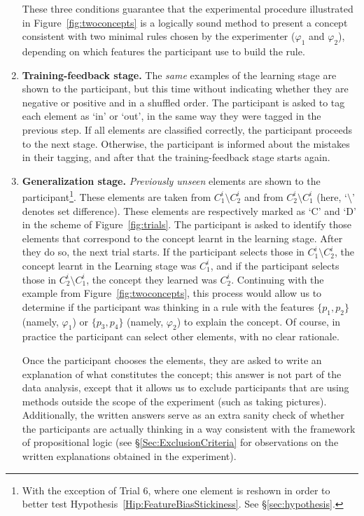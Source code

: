 \begin{enumerate}
  These three conditions guarantee that the experimental procedure illustrated in Figure~\ref{fig:twoconcepts} is a logically sound method to present a concept consistent with two minimal rules chosen by the experimenter ($\varphi_1$ and $\varphi_2$), depending on which features the participant use to build the rule.
    

    \item {\bf Training-feedback stage.} The {\em same} examples of the learning stage are shown to the participant, but this time without indicating whether they are negative or positive and in a shuffled order. The participant is asked to tag each element as `in' or `out', in the same way they were tagged in the previous step. If all elements are classified correctly, the participant proceeds to the next stage. Otherwise, the participant is informed about the mistakes in their tagging, and after that the training-feedback stage starts again.
    
    \item {\bf Generalization stage.} {\em Previously unseen} elements are shown to the participant\footnote{With the exception of Trial 6, where one element is reshown in order to better test Hypothesis~\ref{Hip:FeatureBiasStickiness}. See \S\ref{sec:hypothesis}.}. These elements are taken from $C^i_1\setminus C^i_2$ and from $C^i_2\setminus C^i_1$ (here, `$\setminus$' denotes set difference). These elements are respectively marked as `{\sf C}' and `{\sf D}' in the scheme of Figure~\ref{fig:trials}. The participant is asked to identify those elements that correspond to the concept learnt in the learning stage. After they do so,  the next trial starts. If the participant selects those in $C^i_1\setminus C^i_2$, the concept learnt in the Learning stage was $C^i_1$, and if the participant selects those in $C^i_2\setminus C^i_1$, the concept they learned was $C^i_2$.
    Continuing with the example from Figure~\ref{fig:twoconcepts}, this process would allow us to determine if the participant was thinking in a rule with the features $\{p_1, p_2\}$ (namely, $\varphi_1$) or $\{p_3, p_4\}$ (namely, $\varphi_2$) to explain the concept. Of course, in practice the participant can select other elements, with no clear rationale.
    
    Once the participant chooses the elements, they are asked to write an explanation of what constitutes the concept; this answer is not part of the data analysis, except that it allows us to exclude participants that are using methods outside the scope of the experiment (such as taking pictures). Additionally, the written answers serve as an extra sanity check of whether the participants are actually thinking in a way consistent with the framework of propositional logic (see \S\ref{Sec:ExclusionCriteria} for observations on the written explanations obtained in the experiment).
\end{enumerate}

